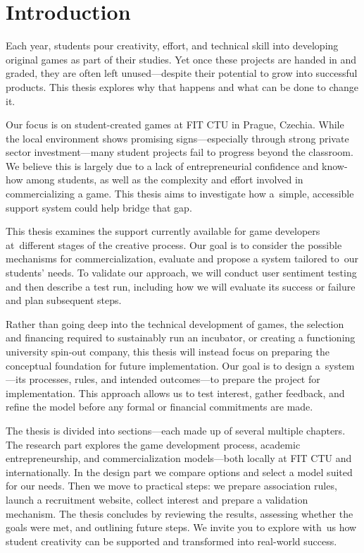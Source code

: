\chapter*{Introduction}
Each year, students pour creativity, effort, and technical skill into developing original games as part of their studies. Yet once these projects are handed in and graded, they are often left unused---despite their potential to grow into successful products. This thesis explores why that happens and what can be done to change it.

Our focus is on student-created games at FIT CTU in Prague, Czechia. While the local environment shows promising signs---especially through strong private sector investment---many student projects fail to progress beyond the classroom. We believe this is largely due to a lack of entrepreneurial confidence and know-how among students, as well as the complexity and effort involved in commercializing a game. This thesis aims to investigate how a~simple, accessible support system could help bridge that gap.

This thesis examines the support currently available for game developers at~different stages of the creative process. Our goal is to consider the possible mechanisms for commercialization, evaluate and propose a system tailored to~our students’ needs. To validate our approach, we will conduct user sentiment testing and then describe a test run, including how we will evaluate its success or failure and plan subsequent steps.

Rather than going deep into the technical development of games, the selection and financing required to sustainably run an incubator, or creating a functioning university spin-out company, this thesis will instead focus on preparing the conceptual foundation for future implementation. Our goal is to design a~system---its processes, rules, and intended outcomes---to prepare the project for implementation. This approach allows us to test interest, gather feedback, and refine the model before any formal or financial commitments are made.

The thesis is divided into sections---each made up of several multiple chapters. The research part explores the game development process, academic entrepreneurship, and commercialization models---both locally at FIT CTU and internationally. In the design part we compare options and select a model suited for our needs. Then we move to practical steps: we prepare association rules, launch a recruitment website, collect interest and prepare a validation mechanism. The thesis concludes by reviewing the results, assessing whether the goals were met, and outlining future steps. We invite you to explore with~us how student creativity can be supported and transformed into real-world success.